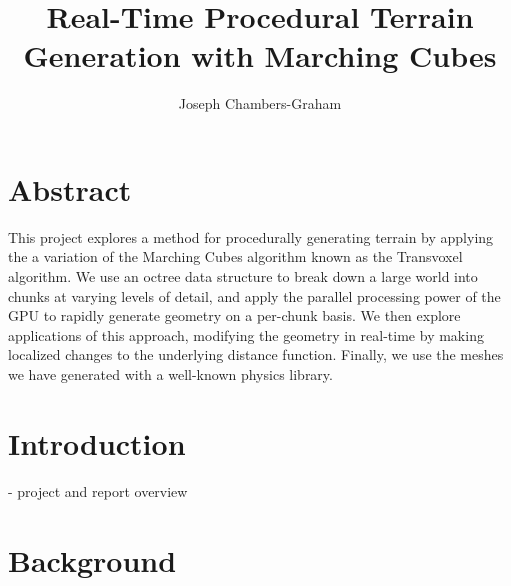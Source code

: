 \documentclass{article}
\title{Real-Time Procedural Terrain Generation with Marching Cubes}
\author{Joseph Chambers-Graham}
\date{}
\begin{document}


\maketitle
\newpage

\section*{Abstract}
This project explores a method for procedurally generating terrain by applying the a variation of the Marching Cubes algorithm known as the Transvoxel algorithm. We use an octree data structure to break down a large world into chunks at varying levels of detail, and apply the parallel processing power of the GPU to rapidly generate geometry on a per-chunk basis. We then explore applications of this approach, modifying the geometry in real-time by making localized changes to the underlying distance function. %
Finally, we use the meshes we have generated with a well-known physics library.
\newpage

\tableofcontents

\newpage
\section{Introduction}
- project and report overview
\section{Background}
\end{document}

